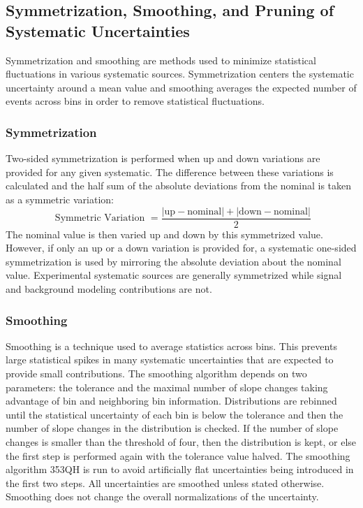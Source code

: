 \subsection{Symmetrization, Smoothing, and Pruning of Systematic Uncertainties}

Symmetrization and smoothing are methods used to minimize statistical fluctuations in various systematic sources.  Symmetrization centers the systematic uncertainty around a mean value and smoothing averages the expected number of events across bins in order to remove statistical fluctuations.

\subsubsection{Symmetrization}
Two-sided symmetrization is performed when up and down variations are provided for any given systematic.  The difference between these variations is calculated and the half sum of the absolute deviations from the nominal is taken as a symmetric variation:
\[ \text{ Symmetric Variation } = \frac{|\text{up} - \text{nominal}| +|\text{down}-\text{nominal}|}{2}  \]
The nominal value is then varied up and down by this symmetrized value.  However, if only an up or a down variation is provided for, a systematic one-sided symmetrization is used by mirroring the absolute deviation about the nominal value.  Experimental systematic sources are generally symmetrized while signal and background modeling contributions are not.

\subsubsection{Smoothing}
Smoothing is a technique used to average statistics across bins.  This prevents large statistical spikes in many systematic uncertainties that are expected to provide small contributions.  The smoothing algorithm depends on two parameters: the tolerance and the maximal number of slope changes taking advantage of bin and neighboring bin information.  Distributions are rebinned until the statistical uncertainty of each bin is below the tolerance and then the number of slope changes in the distribution is checked.  If the number of slope changes is smaller than the threshold of four, then the distribution is kept, or else the first step is performed again with the tolerance value halved.  The smoothing algorithm 353QH\cite{Friedman:695770} is run to avoid artificially flat uncertainties being introduced in the first two steps.  All uncertainties are smoothed unless stated otherwise.  Smoothing does not change the overall normalizations of the uncertainty.

